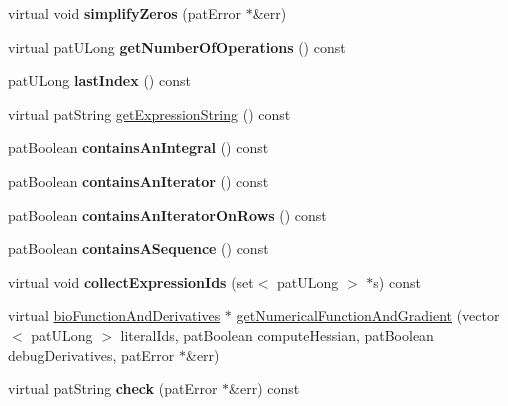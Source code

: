 \begin{DoxyCompactItemize}
virtual void {\bfseries simplify\+Zeros} (pat\+Error $\ast$\&err)
\item 
\mbox{\label{classbio_arith_log_logit_adc9562426b270e7fb3f9b45004232b48}} 
virtual pat\+U\+Long {\bfseries get\+Number\+Of\+Operations} () const
\item 
\mbox{\label{classbio_arith_log_logit_ad69939393c7bd316eca7864f16bb5528}} 
pat\+U\+Long {\bfseries last\+Index} () const
\item 
virtual pat\+String \hyperlink{classbio_arith_log_logit_aa769251f7090278fdae9bd7a03670a53}{get\+Expression\+String} () const
\item 
\mbox{\label{classbio_arith_log_logit_ab6da440fa9bd5c36b8a7bedc780625f4}} 
pat\+Boolean {\bfseries contains\+An\+Integral} () const
\item 
\mbox{\label{classbio_arith_log_logit_a71ac9387000056545590c68a4235ad62}} 
pat\+Boolean {\bfseries contains\+An\+Iterator} () const
\item 
\mbox{\label{classbio_arith_log_logit_a015e643c9fc4e03e58a3b818526c7a92}} 
pat\+Boolean {\bfseries contains\+An\+Iterator\+On\+Rows} () const
\item 
\mbox{\label{classbio_arith_log_logit_af5cefc10eefedc08e9e52deb9fe5b923}} 
pat\+Boolean {\bfseries contains\+A\+Sequence} () const
\item 
\mbox{\label{classbio_arith_log_logit_a6d7578d13eead8239162bdae8b174c28}} 
virtual void {\bfseries collect\+Expression\+Ids} (set$<$ pat\+U\+Long $>$ $\ast$s) const
\item 
virtual \hyperlink{classbio_function_and_derivatives}{bio\+Function\+And\+Derivatives} $\ast$ \hyperlink{classbio_arith_log_logit_a4283d349360bfc928c2f20aa2e235e0c}{get\+Numerical\+Function\+And\+Gradient} (vector$<$ pat\+U\+Long $>$ literal\+Ids, pat\+Boolean compute\+Hessian, pat\+Boolean debug\+Derivatives, pat\+Error $\ast$\&err)
\item 
\mbox{\label{classbio_arith_log_logit_a7b15241fbc39875c9beb3765d8f07658}} 
virtual pat\+String {\bfseries check} (pat\+Error $\ast$\&err) const
\end{DoxyCompactItemize}
